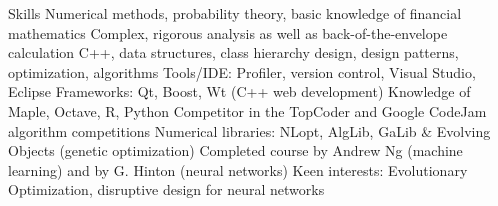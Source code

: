 \begin{rubric}{Skills}
\entry*[]%
Numerical methods, probability theory, basic knowledge of financial mathematics
\entry*[]%
Complex, rigorous analysis as well as back-of-the-envelope calculation
%
%
\entry*[]%
C++, data structures, class hierarchy design, design patterns, optimization, algorithms
\entry*[]%
Tools/IDE: Profiler, version control, Visual Studio, Eclipse
\entry*[]%
Frameworks: Qt, Boost, Wt (C++ web development)
\entry*[]%
Knowledge of Maple, Octave, R, Python
\entry*[]%
Competitor in the TopCoder and Google CodeJam algorithm competitions
%
%
\entry*[]%
Numerical libraries: NLopt, AlgLib, GaLib \& Evolving Objects (genetic optimization)
\entry*[]%
Completed course by Andrew Ng (machine learning) and by G. Hinton (neural networks)
\entry*[]%
Keen interests: Evolutionary Optimization, disruptive design for neural networks
%
%
\end{rubric}
